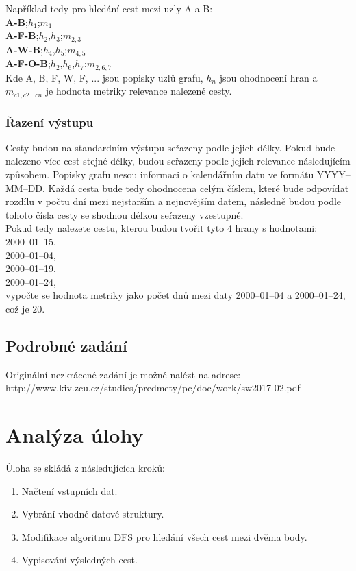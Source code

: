 Například tedy pro hledání cest mezi uzly A a B:\\

\textbf{A-B};$h_{1}$;$m_{1}$\\
\textbf{A-F-B};$h_{2}$,$h_{3}$;$m_{2,3}$\\
\textbf{A-W-B};$h_{4}$,$h_{5}$;$m_{4,5}$\\
\textbf{A-F-O-B};$h_{2}$,$h_{6}$,$h_{7}$;$m_{2,6,7}$\\


Kde A, B, F, W, F, ... jsou popisky uzlů grafu, $h_{n}$ jsou ohodnocení hran a $m_{c1,c2...cn}$ je hodnota metriky relevance nalezené cesty.

\subsection{Řazení výstupu}
Cesty budou na standardním výstupu seřazeny podle jejich délky. Pokud bude nalezeno více cest stejné délky, budou seřazeny podle jejich relevance následujícím způsobem. Popisky grafu nesou informaci o kalendářním datu ve formátu YYYY--MM--DD. Každá cesta bude tedy ohodnocena celým číslem, které bude odpovídat rozdílu v počtu dní mezi nejstarším a nejnovějším datem, následně budou podle tohoto čísla cesty se shodnou délkou seřazeny vzestupně.\\


\newpage
Pokud tedy nalezete cestu, kterou budou tvořit tyto 4 hrany s hodnotami:\\

2000--01--15,\\
2000--01--04,\\
2000--01--19,\\
2000--01--24,\\

vypočte se hodnota metriky jako počet dnů mezi daty 2000--01--04 a 2000--01--24, což je 20.

\section{Podrobné zadání}
Originální nezkrácené zadání je možné nalézt na adrese:\\

http://www.kiv.zcu.cz/studies/predmety/pc/doc/work/sw2017-02.pdf

\setcounter{page}{1}

\chapter{Analýza úlohy}
Úloha se skládá z následujících kroků:
\begin{enumerate}
	\item Načtení vstupních dat.
	\item Vybrání vhodné datové struktury.
	\item Modifikace algoritmu DFS pro hledání všech cest mezi dvěma body.
	\item Vypisování výsledných cest.
\end{enumerate}

